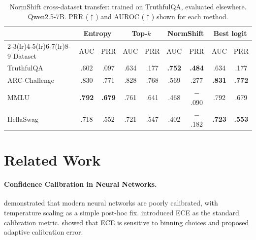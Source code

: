 \documentclass[11pt,a4paper]{article}
\begin{document}
\begin{table}[H]
\centering
\caption{NormShift cross-dataset transfer: trained on TruthfulQA,
         evaluated elsewhere.  Qwen2.5-7B.  PRR ($\uparrow$) and
         AUROC ($\uparrow$) shown for each method.}
\label{tab:polygraph-transfer}
\small
\begin{tabular}{@{}lcc|cc|cc|cc@{}}
\toprule
 & \multicolumn{2}{c|}{Entropy} & \multicolumn{2}{c|}{Top-$k$}
 & \multicolumn{2}{c|}{NormShift} & \multicolumn{2}{c}{Best logit} \\
\cmidrule(lr){2-3}\cmidrule(lr){4-5}\cmidrule(lr){6-7}\cmidrule(lr){8-9}
Dataset & AUC & PRR & AUC & PRR & AUC & PRR & AUC & PRR \\
\midrule
TruthfulQA     & .602 & .097 & .634 & .177 & \textbf{.752} & \textbf{.484}
               & .634 & .177 \\
ARC-Challenge  & .830 & .771 & .828 & .768 & .569 & .277
               & \textbf{.831} & \textbf{.772} \\
MMLU           & \textbf{.792} & \textbf{.679} & .761 & .641 & .468 & $-$.090
               & .792 & .679 \\
HellaSwag      & .718 & .552 & .721 & .547 & .402 & $-$.182
               & \textbf{.723} & \textbf{.553} \\
\bottomrule
\end{tabular}
\end{table}


\section{Related Work}
\label{sec:related}

\paragraph{Confidence Calibration in Neural Networks.}
\citet{guo2017calibration} demonstrated that modern neural networks are
poorly calibrated, with temperature scaling as a simple post-hoc fix.
\citet{naeini2015obtaining} introduced ECE as the standard calibration
metric.  \citet{nixon2019measuring} showed that ECE is sensitive to
binning choices and proposed adaptive calibration error.
\end{document}

